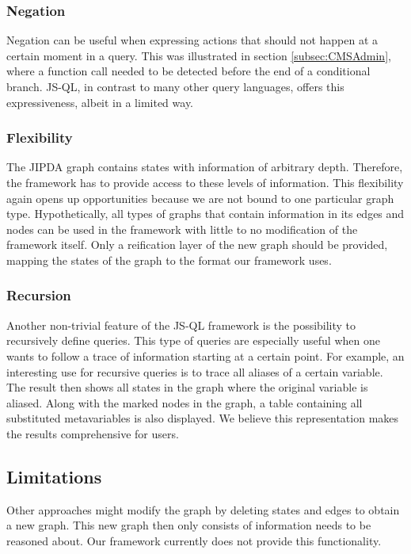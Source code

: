 \subsubsection*{Negation}
Negation can be useful when expressing actions that should not happen at a certain moment in a query. This was illustrated in section \ref{subsec:CMSAdmin}, where a function call needed to be detected before the end of a conditional branch. JS-QL, in contrast to many other query languages, offers this expressiveness, albeit in a limited way. 

\subsubsection*{Flexibility}
The JIPDA graph contains states with information of arbitrary depth. Therefore, the framework has to provide access to these levels of information. This flexibility again opens up opportunities because we are not bound to one particular graph type. Hypothetically, all types of graphs that contain information in its edges and nodes can be used in the framework with little to no modification of the framework itself. Only a reification layer of the new graph should be provided, mapping the states of the graph to the format our framework uses.

\subsubsection*{Recursion}
Another non-trivial feature of the JS-QL framework is the possibility to recursively define queries. This type of queries are especially useful when one wants to follow a trace of information starting at a certain point. For example, an interesting use for recursive queries is to trace all aliases of a certain variable. The result then shows all states in the graph where the original variable is aliased. Along with the marked nodes in the graph, a table containing all substituted metavariables is also displayed. We believe this representation makes the results comprehensive for users.

\subsection{Limitations}

Other approaches might modify the graph by deleting states and edges to obtain a new graph. This new graph then only consists of information needs to be reasoned about. Our framework currently does not provide this functionality. 

